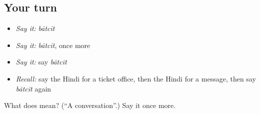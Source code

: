 \subsection*{Your turn}
\begin{itemize}
\raggedright
  \item \emph{Say it:} \emph{bātcīt}
  \item \emph{Say it:} \emph{bātcīt}, once more
  \item \emph{Say it:} say \emph{bātcīt}
  \item \emph{Recall:} say the Hindi for a ticket office, then the Hindi for a message, then say \emph{bātcīt} again
\end{itemize}

\begin{tcolorbox}[breakable,colback=teal!4,colframe=teal!35!black,title={Before you move on}]
What does  mean? (\textquotedblleft{}A conversation\textquotedblright{}.) Say it once more.
\end{tcolorbox}
